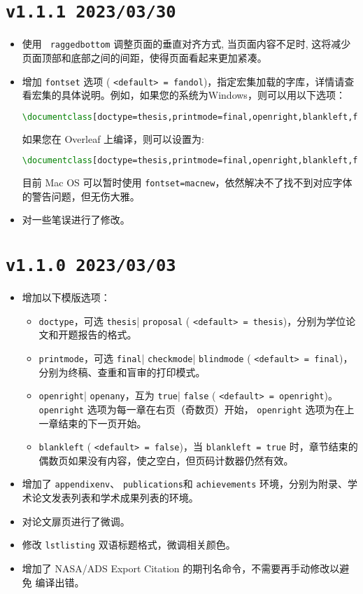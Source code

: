 \section*{\texttt{v1.1.1 2023/03/30}}
\begin{itemize}
    \item 使用 \texttt{ raggedbottom} 调整页面的垂直对齐方式, 当页面内容不足时, 这将减少页面顶部和底部之间的间距，使得页面看起来更加紧凑。
    \item 增加 \texttt{fontset} 选项 ( \texttt{<default> = fandol})，指定\CTeX{}宏集加载的字库，详情请查看\CTeX{}宏集的具体说明。例如，如果您的系统为Windows，则可以用以下选项：
\begin{lstlisting}[language=TeX]
\documentclass[doctype=thesis,printmode=final,openright,blankleft,fontset=windows]{sysuthesis}
\end{lstlisting}
    如果您在 Overleaf 上编译，则可以设置为:
\begin{lstlisting}[language=TeX]
\documentclass[doctype=thesis,printmode=final,openright,blankleft,fontset=ubuntu]{sysuthesis}
\end{lstlisting}
    目前 Mac OS 可以暂时使用 \texttt{fontset=macnew}，依然解决不了找不到对应字体的警告问题，但无伤大雅。
    \item 对一些笔误进行了修改。
\end{itemize}

\section*{\texttt{v1.1.0 2023/03/03}}
\begin{itemize}
    \item 增加以下模版选项：
    \begin{itemize}
        \item \texttt{doctype}，可选 \texttt{thesis}| \texttt{proposal} ( \texttt{<default> = thesis})，分别为学位论文和开题报告的格式。
        \item \texttt{printmode}，可选 \texttt{final}| \texttt{checkmode}| \texttt{blindmode} ( \texttt{<default> = final})，分别为终稿、查重和盲审的打印模式。
        \item \texttt{openright}| \texttt{openany}，互为 \texttt{true}| \texttt{false} ( \texttt{<default> = openright})。\\ \texttt{openright} 选项为每一章在右页（奇数页）开始， \texttt{openright} 选项为在上一章结束的下一页开始。
        \item \texttt{blankleft} ( \texttt{<default> = false})，当 \texttt{blankleft = true} 时，章节结束的偶数页如果没有内容，使之空白，但页码计数器仍然有效。
    \end{itemize}
    \item 增加了 \texttt{appendixenv}、 \texttt{publications}和 \texttt{achievements} 环境，分别为附录、学术论文发表列表和学术成果列表的环境。
    \item 对论文扉页进行了微调。
    \item 修改 \texttt{lstlisting} 双语标题格式，微调相关颜色。
    \item 增加了 NASA/ADS Export Citation 的期刊名命令，不需要再手动修改以避免  编译出错。
\end{itemize}

